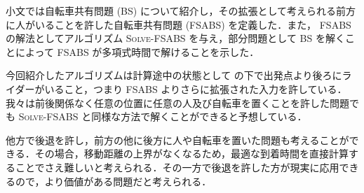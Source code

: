 小文では自転車共有問題 (BS) について紹介し，その拡張として考えられる前方に人がいることを許した自転車共有問題 (FSABS) を定義した．また， FSABS の解法としてアルゴリズム \textsc{Solve-FSABS} を与え，部分問題として BS を解くことによって FSABS が多項式時間で解けることを示した．

今回紹介したアルゴリズムは計算途中の状態として  の下で出発点より後ろにライダーがいること，つまり FSABS よりさらに拡張された入力を許している．我々は前後関係なく任意の位置に任意の人及び自転車を置くことを許した問題でも \textsc{Solve-FSABS} と同様な方法で解くことができると予想している．

他方で後退を許し，前方の他に後方に人や自転車を置いた問題も考えることができる．その場合，移動距離の上界がなくなるため，最適な到着時間を直接計算することでさえ難しいと考えられる．その一方で後退を許した方が現実に応用できるので，より価値がある問題だと考えられる．